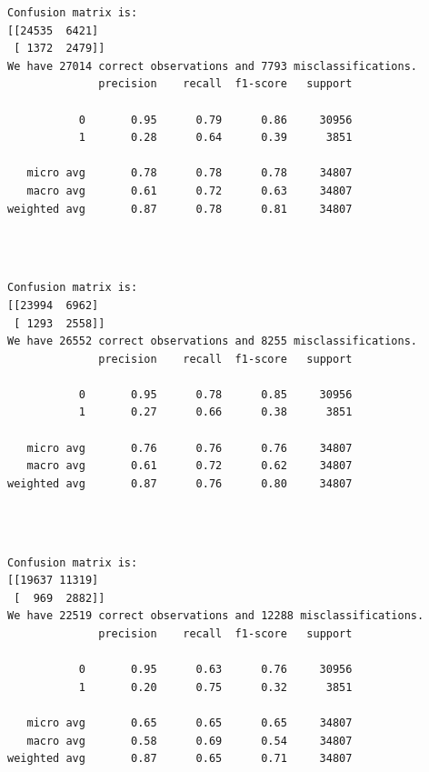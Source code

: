 \documentclass[8pt,onecolumn,aps,pra]{revtex4-1}
\begin{document}
    \begin{Verbatim}[commandchars=\\\{\}]
Confusion matrix is:
[[24535  6421]
 [ 1372  2479]]
We have 27014 correct observations and 7793 misclassifications.
              precision    recall  f1-score   support

           0       0.95      0.79      0.86     30956
           1       0.28      0.64      0.39      3851

   micro avg       0.78      0.78      0.78     34807
   macro avg       0.61      0.72      0.63     34807
weighted avg       0.87      0.78      0.81     34807


    \end{Verbatim}

    \begin{center}
    \end{center}
    { \hspace*{\fill} \\}
    
    \begin{Verbatim}[commandchars=\\\{\}]
Confusion matrix is:
[[23994  6962]
 [ 1293  2558]]
We have 26552 correct observations and 8255 misclassifications.
              precision    recall  f1-score   support

           0       0.95      0.78      0.85     30956
           1       0.27      0.66      0.38      3851

   micro avg       0.76      0.76      0.76     34807
   macro avg       0.61      0.72      0.62     34807
weighted avg       0.87      0.76      0.80     34807


    \end{Verbatim}

    \begin{center}
    \end{center}
    { \hspace*{\fill} \\}
    
    \begin{Verbatim}[commandchars=\\\{\}]
Confusion matrix is:
[[19637 11319]
 [  969  2882]]
We have 22519 correct observations and 12288 misclassifications.
              precision    recall  f1-score   support

           0       0.95      0.63      0.76     30956
           1       0.20      0.75      0.32      3851

   micro avg       0.65      0.65      0.65     34807
   macro avg       0.58      0.69      0.54     34807
weighted avg       0.87      0.65      0.71     34807


    \end{Verbatim}
\end{document}
